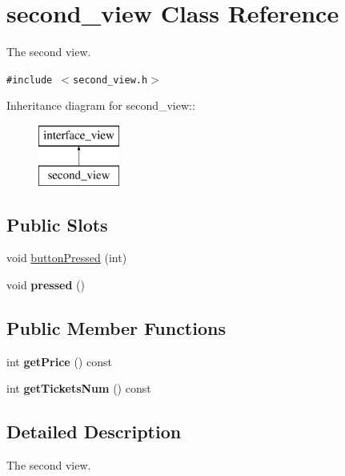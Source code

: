 \hypertarget{classsecond__view}{
\section{second\_\-view Class Reference}
\label{classsecond__view}
}
The second view.  


{\tt \#include $<$second\_\-view.h$>$}

Inheritance diagram for second\_\-view::\begin{figure}[H]
\begin{center}
\leavevmode
\includegraphics[height=2cm]{classsecond__view}
\end{center}
\end{figure}
\subsection*{Public Slots}
\begin{CompactItemize}
\item 
void \hyperlink{classsecond__view_46c6fdf7e691500a94adc9683ae5222e}{buttonPressed} (int)
\item 
\hypertarget{classsecond__view_c0d1a4d914f2008979601af71ec18522}{
void \textbf{pressed} ()}
\label{classsecond__view_c0d1a4d914f2008979601af71ec18522}

\end{CompactItemize}
\subsection*{Public Member Functions}
\begin{CompactItemize}
\item 
\hypertarget{classsecond__view_be79df4fb288ffac252086181606a7e2}{
int \textbf{getPrice} () const }
\label{classsecond__view_be79df4fb288ffac252086181606a7e2}

\item 
\hypertarget{classsecond__view_5c88cd9f38bb0a0b4cc399c3c802aea9}{
int \textbf{getTicketsNum} () const }
\label{classsecond__view_5c88cd9f38bb0a0b4cc399c3c802aea9}

\end{CompactItemize}


\subsection{Detailed Description}
The second view. 

